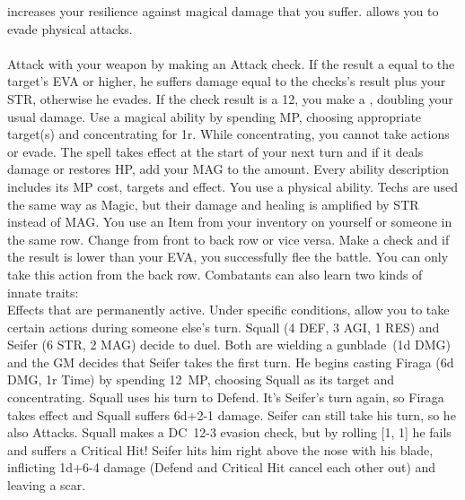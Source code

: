  increases your resilience against magical damage that you suffer. \ofrow
{} allows you to evade physical attacks.
%
\\\\
%
%
\vfill
%
Attack with your weapon by making an Attack check. 
If the result a equal to the target's EVA or higher, he suffers damage equal to the checks's result plus your STR, otherwise he evades.
If the check result is a 12, you make a , doubling your usual damage.\ofgap
%
Use a magical ability by spending MP, choosing appropriate target(s) and concentrating for 1r.
While concentrating, you cannot take actions or evade.
The spell takes effect at the start of your next turn and if it deals damage or restores HP, add your MAG to the amount.
Every ability description includes its MP cost, targets and effect.\ofgap
%
You use a physical ability. 
Techs are used the same way as Magic, but their damage and healing is amplified by STR instead of MAG.\ofgap
%
 You use an Item from your inventory on yourself or someone in the same row.\ofgap
%
 Change from front to back row or vice versa.\ofgap
%
 Make a check and if the result is lower than your EVA, you successfully flee the battle.
You can only take this action from the back row.
%
\vfill
%
Combatants can also learn two kinds of innate traits:\vspace*{0.2cm}\\
 Effects that are permanently active. \ofgap
{} Under specific conditions, allow you to take certain actions during someone else's turn.
%
\vfill
%
{
	Squall (4 DEF, 3 AGI, 1 RES) and Seifer (6 STR, 2 MAG) decide to duel.
	Both are wielding a gunblade~(1d DMG) and the GM decides that Seifer takes the first turn.
	He begins casting Firaga (6d DMG, 1r Time) by spending 12~MP, choosing Squall as its target and concentrating.
	Squall uses his turn to Defend.
	It's Seifer's turn again, so Firaga takes effect and Squall suffers \mbox{6d+2-1} damage. 
	Seifer can still take his turn, so he also Attacks. 
	Squall makes a \mbox{DC 12-3} evasion check, but by rolling [1, 1] he fails and suffers a Critical Hit! 
	Seifer hits him right above the nose with his blade, inflicting \mbox{1d+6-4} damage (Defend and Critical Hit cancel each other out) and leaving a scar.
}
